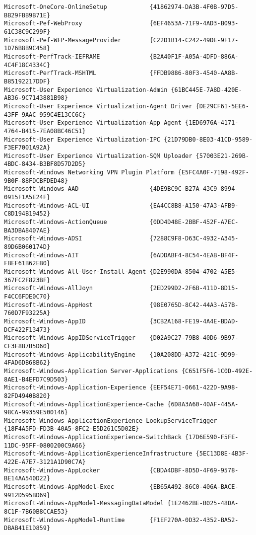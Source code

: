 \documentclass{report}
\begin{document}
\begin{lstlisting}[breaklines=true,basicstyle=\tiny]
Microsoft-OneCore-OnlineSetup            {41862974-DA3B-4F0B-97D5-BB29FBB9B71E}
Microsoft-Pef-WebProxy                   {6EF4653A-71F9-4AD3-B093-61C38C9C299F}
Microsoft-Pef-WFP-MessageProvider        {C22D1B14-C242-49DE-9F17-1D76B8B9C458}
Microsoft-PerfTrack-IEFRAME              {B2A40F1F-A05A-4DFD-886A-4C4F18C4334C}
Microsoft-PerfTrack-MSHTML               {FFDB9886-80F3-4540-AA8B-B85192217DDF}
Microsoft-User Experience Virtualization-Admin {61BC445E-7A8D-420E-AB36-9C7143881B98}
Microsoft-User Experience Virtualization-Agent Driver {DE29CF61-5EE6-43FF-9AAC-959C4E13CC6C}
Microsoft-User Experience Virtualization-App Agent {1ED6976A-4171-4764-B415-7EA08BC46C51}
Microsoft-User Experience Virtualization-IPC {21D79DB0-8E03-41CD-9589-F3EF7001A92A}
Microsoft-User Experience Virtualization-SQM Uploader {57003E21-269B-4BDC-8434-B3BF8D57D2D5}
Microsoft-Windows Networking VPN Plugin Platform {E5FC4A0F-7198-492F-9B0F-88FDCBFDED48}
Microsoft-Windows-AAD                    {4DE9BC9C-B27A-43C9-8994-0915F1A5E24F}
Microsoft-Windows-ACL-UI                 {EA4CC8B8-A150-47A3-AFB9-C8D194B19452}
Microsoft-Windows-ActionQueue            {0DD4D48E-2BBF-452F-A7EC-BA3DBA8407AE}
Microsoft-Windows-ADSI                   {7288C9F8-D63C-4932-A345-89D6B060174D}
Microsoft-Windows-AIT                    {6ADDABF4-8C54-4EAB-BF4F-FBEF61B62EB0}
Microsoft-Windows-All-User-Install-Agent {D2E990DA-8504-4702-A5E5-367FC2F823BF}
Microsoft-Windows-AllJoyn                {2ED299D2-2F6B-411D-8D15-F4CC6FDE0C70}
Microsoft-Windows-AppHost                {98E0765D-8C42-44A3-A57B-760D7F93225A}
Microsoft-Windows-AppID                  {3CB2A168-FE19-4A4E-BDAD-DCF422F13473}
Microsoft-Windows-AppIDServiceTrigger    {D02A9C27-79B8-40D6-9B97-CF3F8B7B5D60}
Microsoft-Windows-ApplicabilityEngine    {10A208DD-A372-421C-9D99-4FAD6DB68B62}
Microsoft-Windows-Application Server-Applications {C651F5F6-1C0D-492E-8AE1-B4EFD7C9D503}
Microsoft-Windows-Application-Experience {EEF54E71-0661-422D-9A98-82FD4940B820}
Microsoft-Windows-ApplicationExperience-Cache {6D8A3A60-40AF-445A-98CA-99359E500146}
Microsoft-Windows-ApplicationExperience-LookupServiceTrigger {18F4A5FD-FD3B-40A5-8FC2-E5D261C5D02E}
Microsoft-Windows-ApplicationExperience-SwitchBack {17D6E590-F5FE-11DC-95FF-0800200C9A66}
Microsoft-Windows-ApplicationExperienceInfrastructure {5EC13D8E-4B3F-422E-A7E7-3121A1D90C7A}
Microsoft-Windows-AppLocker              {CBDA4DBF-8D5D-4F69-9578-BE14AA540D22}
Microsoft-Windows-AppModel-Exec          {EB65A492-86C0-406A-BACE-9912D595BD69}
Microsoft-Windows-AppModel-MessagingDataModel {1E2462BE-B025-48DA-8C1F-7B60B8CCAE53}
Microsoft-Windows-AppModel-Runtime       {F1EF270A-0D32-4352-BA52-DBAB41E1D859}

\end{lstlisting}
\end{document}
